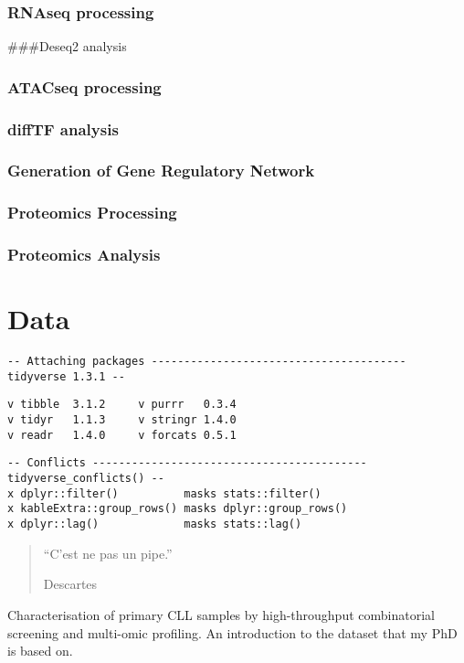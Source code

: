 \documentclass[11pt, a4paper, twosided]{book}
\begin{document}
\hypertarget{rnaseq-processing}{%
\subsection{RNAseq processing}\label{rnaseq-processing}}

\#\#\#Deseq2 analysis

\hypertarget{atacseq-processing}{%
\subsection{ATACseq processing}\label{atacseq-processing}}

\hypertarget{difftf-analysis}{%
\subsection{diffTF analysis}\label{difftf-analysis}}

\hypertarget{generation-of-gene-regulatory-network}{%
\subsection{Generation of Gene Regulatory Network}\label{generation-of-gene-regulatory-network}}

\hypertarget{proteomics-processing}{%
\subsection{Proteomics Processing}\label{proteomics-processing}}

\hypertarget{proteomics-analysis}{%
\subsection{Proteomics Analysis}\label{proteomics-analysis}}

\hypertarget{data}{%
\chapter{Data}\label{data}}
\begin{verbatim}
-- Attaching packages --------------------------------------- tidyverse 1.3.1 --
\end{verbatim}
\begin{verbatim}
v tibble  3.1.2     v purrr   0.3.4
v tidyr   1.1.3     v stringr 1.4.0
v readr   1.4.0     v forcats 0.5.1
\end{verbatim}
\begin{verbatim}
-- Conflicts ------------------------------------------ tidyverse_conflicts() --
x dplyr::filter()          masks stats::filter()
x kableExtra::group_rows() masks dplyr::group_rows()
x dplyr::lag()             masks stats::lag()
\end{verbatim}
\begin{quote}
``C'est ne pas un pipe.''

Descartes
\end{quote}
Characterisation of primary CLL samples by high-throughput combinatorial screening and multi-omic profiling. An introduction to the dataset that my PhD is based on.
\end{document}
